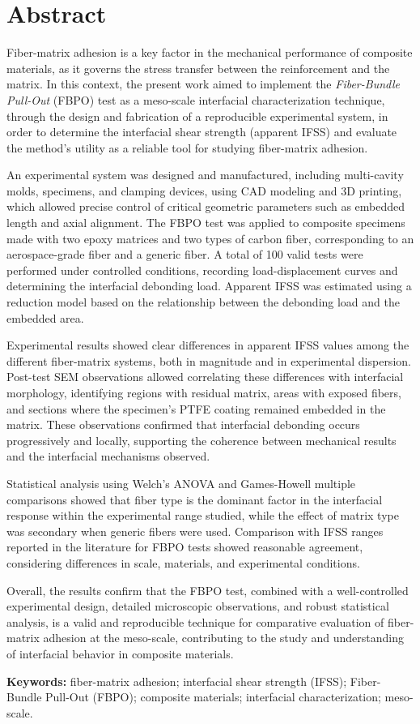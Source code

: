 \section*{Abstract}

Fiber-matrix adhesion is a key factor in the mechanical performance of composite materials,
as it governs the stress transfer between the reinforcement and the matrix. In this context,
the present work aimed to implement the \textit{Fiber-Bundle Pull-Out} (FBPO) test as a
meso-scale interfacial characterization technique, through the design and fabrication of a
reproducible experimental system, in order to determine the interfacial shear strength
(apparent IFSS) and evaluate the method's utility as a reliable tool for studying fiber-matrix
adhesion.

An experimental system was designed and manufactured, including multi-cavity molds, specimens,
and clamping devices, using CAD modeling and 3D printing, which allowed precise control of
critical geometric parameters such as embedded length and axial alignment. The FBPO test was
applied to composite specimens made with two epoxy matrices and two types of carbon fiber,
corresponding to an aerospace-grade fiber and a generic fiber. A total of 100 valid tests
were performed under controlled conditions, recording load-displacement curves and determining
the interfacial debonding load. Apparent IFSS was estimated using a reduction model based on
the relationship between the debonding load and the embedded area.

Experimental results showed clear differences in apparent IFSS values among the different
fiber-matrix systems, both in magnitude and in experimental dispersion. Post-test SEM
observations allowed correlating these differences with interfacial morphology, identifying
regions with residual matrix, areas with exposed fibers, and sections where the specimen's
PTFE coating remained embedded in the matrix. These observations confirmed that interfacial
debonding occurs progressively and locally, supporting the coherence between mechanical
results and the interfacial mechanisms observed.

Statistical analysis using Welch's ANOVA and Games-Howell multiple comparisons showed that
fiber type is the dominant factor in the interfacial response within the experimental
range studied, while the effect of matrix type was secondary when generic fibers were used.
Comparison with IFSS ranges reported in the literature for FBPO tests showed reasonable agreement,
considering differences in scale, materials, and experimental conditions.

Overall, the results confirm that the FBPO test, combined with a well-controlled experimental
design, detailed microscopic observations, and robust statistical analysis, is a valid and
reproducible technique for comparative evaluation of fiber-matrix adhesion at the meso-scale,
contributing to the study and understanding of interfacial behavior in composite materials.

\noindent\textbf{Keywords:} fiber-matrix adhesion; interfacial shear strength (IFSS);
Fiber-Bundle Pull-Out (FBPO); composite materials; interfacial characterization; meso-scale.
